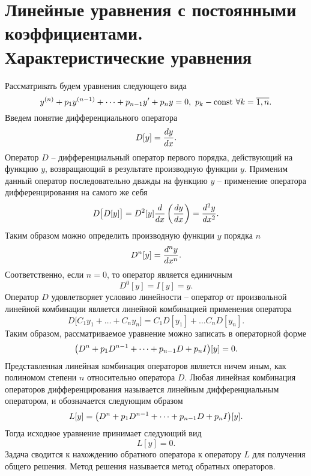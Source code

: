\section{Линейные уравнения с постоянными коэффициентами. Характеристические уравнения}
    Рассматривать будем уравнения следующего вида
    \[
        y^{(n)} + p_1 y^{(n - 1)} + \dots + p_{n - 1} y' + p_n y = 0, ~ p_k - \mathrm{const} ~ \forall k = \overline{1, n}.
    \]
    Введем понятие дифференциального оператора
    \[
        D[y] = \dfrac{d y}{d x}.
    \]
    Оператор $ D $ -- дифференциальный оператор первого порядка, действующий на функцию $ y $, возвращающий в результате производную функции $ y $. Применим данный оператор последовательно дважды на функцию $ y $ -- применение оператора дифференцирования на самого же себя
    \[
        D \big[ D[y] \big] = D^2 [y] \dfrac{d }{d x} \left( \dfrac{d y}{d x} \right) = \dfrac{d^{2} y}{d x^{2}}.
    \]
    Таким образом можно определить производную функции $ y $ порядка $ n $
    \[
        D^n[y] = \dfrac{d^{n} y}{d x^{n}}.
    \]
    Соответственно, если $ n = 0 $, то оператор является единичным
    \[
        D^0[y] = I[y] = y.
    \]
    Оператор $ D $ удовлетворяет условию линейности -- оператор от произвольной линейной комбинации является линейной комбинацией применения оператора
    \[
        D \big[ C_1 y_1 + \dots + C_n y_n \big] = C_1 D[y_1] + \dots C_n D[y_n].
    \]
    Таким образом, рассматриваемое уравнение можно записать в операторной форме
    \[
        \bigl( D^n + p_1 D^{n - 1} + \dots + p_{n - 1} D + p_n I \bigr) [y] = 0.
    \]
    Представленная линейная комбинация операторов является ничем иным, как полиномом степени $ n $ относительно оператора $ D $. Любая линейная комбинация операторов дифференцирования называется линейным дифференциальным оператором, и обозначается следующим образом
    \[
        L[y] = \bigl( D^n + p_1 D^{n - 1} + \dots + p_{n - 1} D + p_n I \bigr) [y].
    \]
    Тогда исходное уравнение принимает следующий вид
    \[
        L[y] = 0.
    \]
    Задача сводится к нахождению обратного оператора к оператору $ L $ для получения общего решения. Метод решения называется метод обратных операторов.

